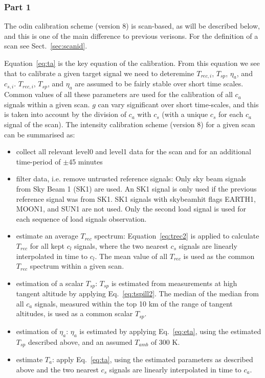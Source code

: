 \documentclass[12pt]{article}
\begin{document}
\subsubsection{Part 1}
\label{sec:part1}
The odin calibration scheme (version 8) is scan-based,
as will be described below,
and this is one of the main difference to previous verisons.
For the definition of a scan see Sect.~\ref{sec:scanid}.

Equation~\ref{eq:ta} is the key equation of the calibration. 
From this equation we see that to calibrate a given target signal 
we need to deteremine \(T_{rec,i}\), \(T_{sp}\), \(\eta_{a}\),
and \(c_{s,i}\). \(T_{rec,i}\), \(T_{sp}\), and \(\eta_{a}\)
are assumed to be fairly stable over short time scales.
Common values of all these parameters are used for
the calibration of all \(c_{a}\) signals within a given scan.
\(g\) can vary significant over short time-scales,
and this is taken into account by the division of \(c_{a}\) with
\(c_{s}\) (with a unique \(c_{s}\) for each \(c_{a}\) 
signal of the scan). The intensity calibration scheme (version 8) 
for a given scan can be summarised as:
\begin{itemize}
\item collect all relevant level0 and level1 data for the scan and for an additional time-period of \(\pm\)45 minutes 
\item filter data, i.e. remove untrusted reference signals:\newline
Only sky beam signals from Sky Beam 1 (SK1) are used.
An SK1 signal is only used if the previous
reference signal was from SK1.
SK1 signals with skybeamhit flags EARTH1, MOON1, and SUN1 are not used.
Only the second load signal is used for each sequence of load signals
observation.  
  
\item estimate an average \(T_{rec}\) spectrum:\newline
Equation~\ref{eq:trec2} is applied to calculate \(T_{rec}\)  
for all kept \(c_{l}\) signals, where 
the two nearest \(c_{s}\) signals are linearly interpolated
in time to \(c_{l}\). 
The mean value of all \(T_{rec}\) is used as the 
common \(T_{rec}\) spectrum within a given scan.
\item estimation of a scalar \(T_{sp}\):\newline
\(T_{sp}\) is estimated from measurements at high tangent altitude
by applying Eq.~\ref{eq:tspill2}.
The median of the median 
from all \(c_{a}\) signals, measured within the top 10 km 
of the range of tangent altitudes, is used as a common scalar \(T_{sp}\).
\item estimation of \(\eta_{a}\):\newline
\(\eta_{a}\) is estimated by applying Eq.~\ref{eq:eta}, 
using the estimated \(T_{sp}\) described above, and an
assumed \(T_{amb}\) of 300 K.
\item estimate \(T_{a}\): \newline
apply Eq.~\ref{eq:ta}, using the estimated parameters as described 
above and   
the two nearest \(c_{s}\) signals are linearly interpolated
in time to \(c_{a}\).
\end{itemize}
\end{document}
